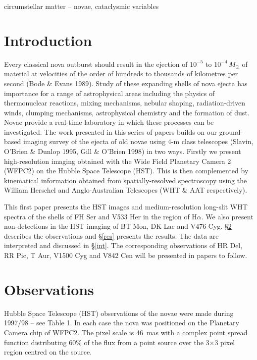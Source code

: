 \begin{keywords}
circumstellar matter -- novae, cataclysmic variables
\end{keywords}

\section {Introduction}

Every classical nova outburst should result in the ejection of
$10^{-5}$ to $10^{-4}\,M_{\odot}$ of material at velocities of the
order of hundreds to thousands of kilometres per second (Bode \& Evans
1989).  Study of these expanding shells of nova ejecta has importance
for a range of astrophysical areas including the physics of
thermonuclear reactions, mixing mechanisms, nebular shaping,
radiation-driven winds, clumping mechanisms, astrophysical chemistry
and the formation of dust. Novae
provide a real-time laboratory in which these processes can be
investigated. The work presented in this series of papers builds on our
ground-based imaging survey of the ejecta of old novae using 4-m class
telescopes (Slavin, O'Brien \& Dunlop 1995, Gill \& O'Brien 1998) in
two ways. Firstly we present high-resolution imaging obtained with the
Wide Field Planetary Camera 2 (WFPC2) on the Hubble Space Telescope
(HST). This is then complemented by kinematical information obtained from
spatially-resolved spectroscopy using the William Herschel and
Anglo-Australian Telescopes (WHT \& AAT respectively).


This first paper presents the HST images and medium-resolution long-slit
WHT spectra of the shells of FH Ser and V533 Her in the region of
H$\alpha$. We also present non-detections in the HST imaging of BT Mon,
DK Lac and V476 Cyg. 
\S \ref{obs} describes the observations and \S \ref{res}
presents the results. The data are interpreted and discussed in
\S \ref{int}. The corresponding observations of HR Del, RR Pic, T Aur,
V1500 Cyg and V842 Cen will be presented in papers to follow.

\section{Observations}
\label{obs}

Hubble Space Telescope (HST) observations of the novae were made during 
1997/98 -- see Table 1. In each case the nova was positioned 
on the Planetary Camera chip of WFPC2. The pixel scale is 46~mas with a complex
point spread function distributing 60\% of the flux from a point source over
the 3$\times$3 pixel region centred on the source.

